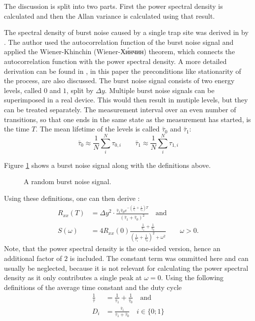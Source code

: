 The discussion is split into two parts. First the power spectral density is calculated and then the Allan variance is calculated using that result.

The spectral density of burst noise caused by a single trap site was derived in \cite{burst_noise_wiener_khinchin} by \citeauthor{burst_noise_wiener_khinchin}. The author used the autocorrelation function of the burst noise signal and applied the Wiener-Khinchin (Wiener-Хи́нчин) theorem, which connects the autocorrelation function with the power spectral density. A more detailed derivation can be found in \cite{fundamentals_of_noise_processes}, in this paper the preconditions like stationarity of the process, are also discussed. The burst noise signal consists of two energy levels, called $0$ and $1$, split by $\Delta y$. Multiple burst noise signals can be superimposed in a real device. This would then result in mutiple levels, but they can be treated separately. The measurement interval over an even number of transitions, so that one ends in the same state as the measurement has started, is the time $T$. The mean lifetime of the levels is called $\bar \tau_0$ and $\bar \tau_1$:
\begin{equation}
    \bar \tau_{0} \approx \frac 1 N \sum_{i}^N \tau_{0,i} \qquad \bar \tau_{1} \approx \frac 1 N \sum_{i}^N \tau_{1,i}
\end{equation}

Figure \ref{fig:burst_noise} shows a burst noise signal along with the definitions above.

\begin{figure}[hb]
    \centering
    \caption{A random burst noise signal.}
    \label{fig:burst_noise}
\end{figure}

Using these definitions, one can then derive \cite{burst_noise_wiener_khinchin}:
\begin{align}
    R_{xx}(T) &= \Delta y^2 \cdot \frac{\bar \tau_1 \bar \tau_0 e^{-\left(\frac{1}{\bar \tau_1}+\frac{1}{\bar \tau_0}\right)T}}{\left(\bar \tau_1 + \bar \tau_0\right)^2} \quad \text{and} \label{eqn:burst_noise_correlation}\\
    S(\omega) &= 4 R_{xx}(0) \frac{\frac{1}{\bar \tau_1} + \frac{1}{\bar \tau_0}}{\left(\frac{1}{\bar \tau_1} + \frac{1}{\bar \tau_0}\right)^2 + \omega^2} \qquad \omega > 0 . \label{eqn:burst_noise_psd}
\end{align}
Note, that the power spectral density is the one-sided version, hence an additional factor of $2$ is included. The constant term was ommitted here and can usually be neglected, because it is not relevant for calculating the power spectral density as it only contributes a single peak at $\omega=0$. Using the following definitions of the average time constant and the duty cycle
\begin{align}
    \frac{1}{\bar \tau} &= \frac{1}{\bar \tau_1} + \frac{1}{\bar \tau_0} \quad \mathrm{and} \label{eqn:definition_bar_tau}\\
    D_i &= \frac{\bar \tau_i}{\bar \tau_1 + \bar \tau_0} \quad i \in \{0 ; 1\}
\end{align}

